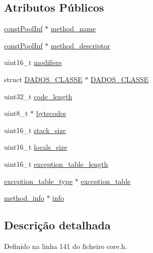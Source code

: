 \subsection*{Atributos Públicos}
\begin{DoxyCompactItemize}
\item 
\hyperlink{structconst_pool_inf}{const\-Pool\-Inf} $\ast$ \hyperlink{structmethod__data_acc4747daee0a91ee73f94422c8b833ab}{method\-\_\-name}
\item 
\hyperlink{structconst_pool_inf}{const\-Pool\-Inf} $\ast$ \hyperlink{structmethod__data_ae4a01197c105855d2e337fb8875358a8}{method\-\_\-descriptor}
\item 
uint16\-\_\-t \hyperlink{structmethod__data_a2abb22d9f683ff1163f58d9b071902bd}{modifiers}
\item 
struct \hyperlink{struct_d_a_d_o_s___c_l_a_s_s_e}{D\-A\-D\-O\-S\-\_\-\-C\-L\-A\-S\-S\-E} $\ast$ \hyperlink{structmethod__data_a2a372a889aabaea0e0b4a08be11cbfa3}{D\-A\-D\-O\-S\-\_\-\-C\-L\-A\-S\-S\-E}
\item 
uint32\-\_\-t \hyperlink{structmethod__data_a9c6035e8b389eea9bc15f380cffefe8b}{code\-\_\-length}
\item 
uint8\-\_\-t $\ast$ \hyperlink{structmethod__data_a602f386ab76983d72ba48488f8c309a9}{bytecodes}
\item 
uint16\-\_\-t \hyperlink{structmethod__data_a0c23eae5e5fe3302c9c1b7f8e5543e3c}{stack\-\_\-size}
\item 
uint16\-\_\-t \hyperlink{structmethod__data_a09b30df4053904e1ebe666ae1ccc45d4}{locals\-\_\-size}
\item 
uint16\-\_\-t \hyperlink{structmethod__data_ac5f08aab5ad351365c25e550c4a0bfb3}{exception\-\_\-table\-\_\-length}
\item 
\hyperlink{structexception__table__type}{exception\-\_\-table\-\_\-type} $\ast$ \hyperlink{structmethod__data_ad9179cc8edbe4688c2f97359cc05ccd0}{exception\-\_\-table}
\item 
\hyperlink{structmethod__info}{method\-\_\-info} $\ast$ \hyperlink{structmethod__data_ae433725619fdadbb915ae3f51198208b}{info}
\end{DoxyCompactItemize}


\subsection{Descrição detalhada}


Definido na linha 141 do ficheiro core.\-h.



